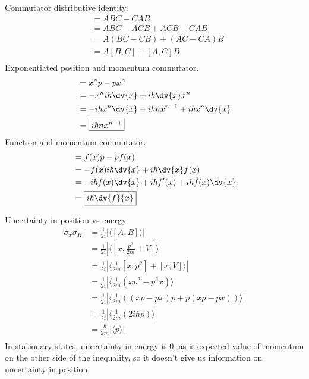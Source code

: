 \documentclass[newpage]{homework}
\begin{document}
\maketitle

\question
Commutator distributive identity.
\begin{align*}
	[AB,C]	&=	ABC - CAB \\
	&=	ABC - ACB + ACB - CAB\\
	&=	A(BC - CB) + (AC - CA)B \\
	&=	\boxed{A[B,C] + [A,C]B}	\\
\end{align*}
Exponentiated position and momentum commutator.
\begin{align*}
	[x^n, p]	&=	x^n p - p x^n	\\
	&=	-x^n i\hbar \dv{x} + i\hbar \dv{x} x^n		\\
	&=	-i\hbar x^n \dv{x} + i\hbar nx^{n-1} + i\hbar x^n \dv{x}	\\
	&=	\boxed{i\hbar nx^{n-1}}	\\
\end{align*}
Function and momentum commutator.
\begin{align*}
	[f(x), p]	&=	f(x) p - p f(x)	\\
	&=	- f(x) i\hbar\dv{x} + i\hbar\dv{x} f(x)	\\
	&=	- i\hbar f(x)\dv{x} + i\hbar f'(x) + i\hbar f(x)\dv{x}	\\
	&=	\boxed{i\hbar \dv{f}{x}}
\end{align*}

\question
Uncertainty in position vs energy.
\begin{align*}
	\sigma_x \sigma_H	&=	\frac{1}{2i} |\langle [A,B] \rangle|	\\
	&=	\frac{1}{2i} |\langle [x,\frac{p^2}{2m} + V] \rangle|	\\
	&=	\frac{1}{2i} |\langle \frac{1}{2m}[x,p^2] + [x,V] \rangle|	\\
	&=	\frac{1}{2i} |\langle \frac{1}{2m}(xp^2 - p^2x)\rangle|	\\
	&=	\frac{1}{2i} |\langle \frac{1}{2m}((xp-px)p + p(xp-px))\rangle|	\\
	&=	\frac{1}{2i} |\langle \frac{1}{2m}(2i\hbar p)\rangle|	\\
	&=	\boxed{\frac{\hbar}{2m} |\langle p \rangle|}	\\
\end{align*}
In stationary states, uncertainty in energy is 0, as is expected value of momentum on the other side of the inequality, so it doesn't give us information on uncertainty in position.
\end{document}
